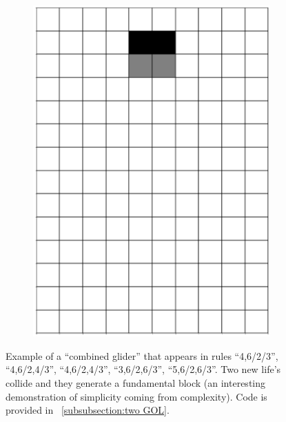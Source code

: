 \documentclass[12pt]{article}
\numberwithin{figure}{section} %
\begin{document}
\begin{figure}[H]
\begin{subfigure}{0.22\textwidth}
     		\includegraphics[width=\linewidth]{Section4/37.7}
     		\subcaption{}
   	\end{subfigure}
   	\caption[Example of a "combined glider"]{Example of a “combined glider” that appears in rules “4,6/2/3”, “4,6/2,4/3”, “4,6/2,4/3”, “3,6/2,6/3”, “5,6/2,6/3”. Two new life's collide and they generate a fundamental block (an interesting demonstration of simplicity coming from complexity). Code is provided in ~\ref{subsubsection:two GOL}. }
   	\label{fig:two GOL}
	\vspace{-1.5em}
\end{figure}
\end{document}
